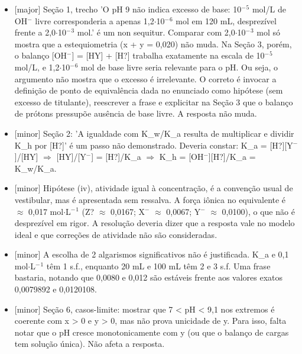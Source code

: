 \documentclass{article}%
\begin{document}
\begin{itemize}%
\item%
{[}major{]} Seção 1, trecho 'O pH 9 não indica excesso de base: 10$^{-}$$^{5}$ mol/L de OH$^{-}$ livre corresponderia a apenas 1,2$\cdot$10$^{-}$$^{6}$ mol em 120 mL, desprezível frente a 2,0$\cdot$10$^{-}$$^3$ mol.' é um non sequitur. Comparar com 2,0$\cdot$10$^{-}$$^3$ mol só mostra que a estequiometria (x + y = 0,020) não muda. Na Seção 3, porém, o balanço {[}OH$^{-}${]} = {[}HY{]} + {[}H?{]} trabalha exatamente na escala de 10$^{-}$$^{5}$ mol/L, e 1,2$\cdot$10$^{-}$$^{6}$ mol de base livre seria relevante para o pH. Ou seja, o argumento não mostra que o excesso é irrelevante. O correto é invocar a definição de ponto de equivalência dada no enunciado como hipótese (sem excesso de titulante), reescrever a frase e explicitar na Seção 3 que o balanço de prótons pressupõe ausência de base livre. A resposta não muda.%
\item%
{[}minor{]} Seção 2: 'A igualdade com K\_w/K\_a resulta de multiplicar e dividir K\_h por {[}H?{]}' é um passo não demonstrado. Deveria constar: K\_a = {[}H?{]}{[}Y$^{-}${]}/{[}HY{]} $\Rightarrow$ {[}HY{]}/{[}Y$^{-}${]} = {[}H?{]}/K\_a $\Rightarrow$ K\_h = {[}OH$^{-}${]}{[}H?{]}/K\_a = K\_w/K\_a.%
\item%
{[}minor{]} Hipótese (iv), atividade igual à concentração, é a convenção usual de vestibular, mas é apresentada sem ressalva. A força iônica no equivalente é $\approx$ 0,017 mol$\cdot$L$^{-}$$^{1}$ (Z? $\approx$ 0,0167; X$^{-}$ $\approx$ 0,0067; Y$^{-}$ $\approx$ 0,0100), o que não é desprezível em rigor. A resolução deveria dizer que a resposta vale no modelo ideal e que correções de atividade não são consideradas.%
\item%
{[}minor{]} A escolha de 2 algarismos significativos não é justificada. K\_a e 0,1 mol$\cdot$L$^{-}$$^{1}$ têm 1 s.f., enquanto 20 mL e 100 mL têm 2 e 3 s.f. Uma frase bastaria, notando que 0,0080 e 0,012 são estáveis frente aos valores exatos 0,0079892 e 0,0120108.%
\item%
{[}minor{]} Seção 6, casos{-}limite: mostrar que 7 < pH < 9,1 nos extremos é coerente com x > 0 e y > 0, mas não prova unicidade de y. Para isso, falta notar que o pH cresce monotonicamente com y (ou que o balanço de cargas tem solução única). Não afeta a resposta.%
\end{itemize}%
\end{document}
